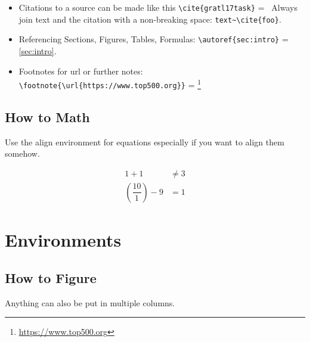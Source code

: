 \documentclass[11pt,
               a4paper,
               bibtotoc,
               idxtotoc,
               headsepline,
               footsepline,
               footexclude,
               BCOR12mm,
               DIV13,
               openany,   %
               ]
               {scrbook}
\begin{document}
\begin{itemize}
    \item Citations to a source can be made like this \verb|\cite{gratl17task}| =~\cite{gratl17task}
    \subitem Always join text and the citation with a non-breaking space: \verb|text~\cite{foo}|.
    \item Referencing Sections, Figures, Tables, Formulas: \verb|\autoref{sec:intro}| = \autoref{sec:intro}.
    \item Footnotes for url or further notes: \verb|\footnote{\url{https://www.top500.org}}| = \footnote{\url{https://www.top500.org}}
\end{itemize}

\subsection{How to Math}

Use the align environment for equations especially if you want to align them somehow.

\begin{align}
1 + 1 &\ne 3\\
\left(\dfrac{10}{1}\right) - 9 &= 1
\end{align}

\clearpage

\section{Environments}

\subsection{How to Figure}

Anything can also be put in multiple columns.
\end{document}
